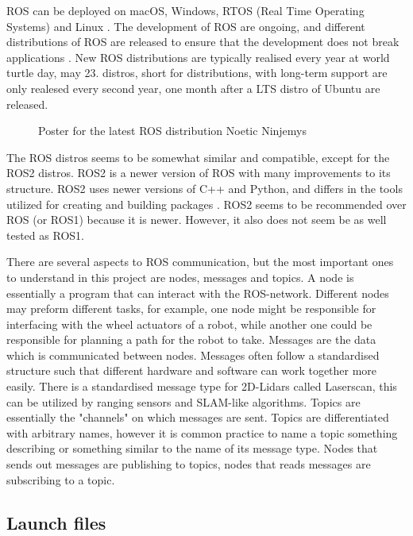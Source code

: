 ROS can be deployed on macOS, Windows, RTOS (Real Time Operating Systems) and Linux \cite{WhyROS}. The development of ROS are ongoing, and different distributions of ROS are released to ensure that the development does not break applications \cite{REP2000}. New ROS distributions are typically realised every year at world turtle day, may 23. distros, short for distributions, with long-term support are only realesed every second year, one month after a LTS distro of Ubuntu are released. 

\begin{figure}[H]
\centering

  \caption{Poster for the latest ROS distribution Noetic Ninjemys \cite{ROSLogo}}
  \label{fig:noeticLogo}
\end{figure}

The ROS distros seems to be somewhat similar and compatible, except for the ROS2 distros. ROS2 is a newer version of ROS with many improvements to its structure. ROS2 uses newer versions of C++ and Python, and differs in the tools utilized for creating and building packages \cite{ROSChanges}. ROS2 seems to be recommended over ROS (or ROS1) because it is newer. However, it also does not seem be as well tested as ROS1.

There are several aspects to ROS communication, but the most important ones to understand in this project are nodes, messages and topics. A node is essentially a program that can interact with the ROS-network. Different nodes may preform different tasks, for example, one node might be responsible for interfacing with the wheel actuators of a robot, while another one could be responsible for planning a path for the robot to take. Messages are the data which is communicated between nodes. Messages often follow a standardised structure such that different hardware and software can work together more easily. There is a standardised message type for 2D-Lidars called Laserscan, this can be utilized by ranging sensors and SLAM-like algorithms.  Topics are essentially the "channels" on which messages are sent. Topics are differentiated with arbitrary names, however it is common practice to name a topic something describing or something similar to the name of its message type. Nodes that sends out messages are publishing to topics, nodes that reads messages are subscribing to a topic. 

\subsection{Launch files}

